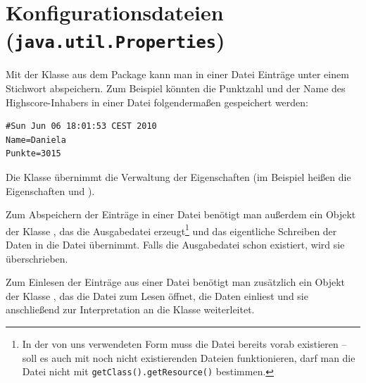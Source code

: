 \clearpage

\rehead[]{\textcolor{lightblue}{AvHG, Inf, My}}
\lohead[]{\textcolor{lightblue}{AvHG, Inf, My}}

\section{Konfigurationsdateien (\texttt{java.util.Properties})}

Mit der Klasse  aus dem Package  kann
man in einer Datei Einträge unter einem Stichwort abspeichern. Zum Beispiel
könnten die Punktzahl und der Name des Highscore-Inhabers in einer Datei
folgendermaßen gespeichert werden:

\begin{lstlisting}
#Sun Jun 06 18:01:53 CEST 2010
Name=Daniela
Punkte=3015
\end{lstlisting}

Die Klasse  übernimmt die Verwaltung der Eigenschaften (im
Beispiel heißen die Eigenschaften  und ).

Zum Abspeichern der Einträge in einer Datei benötigt man außerdem ein
Objekt der Klasse , das die Ausgabedatei
erzeugt\footnote{In der von uns verwendeten Form muss die Datei bereits vorab
existieren -- soll es auch mit noch nicht existierenden Dateien funktionieren,
darf man die Datei nicht mit \texttt{getClass().getResource()} bestimmen.}
und das eigentliche Schreiben der Daten in die Datei übernimmt. Falls die
Ausgabedatei schon existiert, wird sie überschrieben.

Zum Einlesen der Einträge aus einer Datei benötigt man zusätzlich ein Objekt
der Klasse , das die Datei zum Lesen öffnet, die
Daten einliest und sie anschließend zur Interpretation an die Klasse
 weiterleitet.


